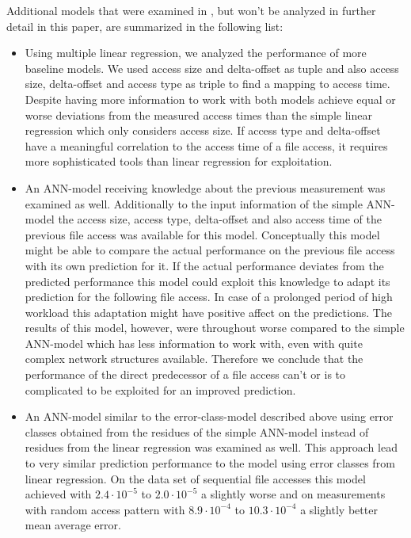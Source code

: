 \documentclass{superfri}
\begin{document}
	Additional models that were examined in \cite{VVEIHUDVVN15}, but won't be analyzed in further detail in this paper, are summarized in the following list:
	\begin{itemize}
		\item Using multiple linear regression, we analyzed the performance of more baseline models. We used access size and delta-offset as tuple and also access size, delta-offset and access type as triple to find a mapping to access time.
		Despite having more information to work with both models achieve equal or worse deviations from the measured access times than the simple linear regression which only considers access size.
		If access type and delta-offset have a meaningful correlation to the access time of a file access, it requires more sophisticated tools than linear regression for exploitation.
		\item An ANN-model receiving knowledge about the previous measurement was examined as well.
		Additionally to the input information of the simple ANN-model the access size, access type, delta-offset and also access time of the previous file access was available for this model.
		Conceptually this model might be able to compare the actual performance on the previous file access with its own prediction for it. If the actual performance deviates from the predicted performance this model could exploit this knowledge to adapt its prediction for the following file access. In case of a prolonged period of high workload this adaptation might have positive affect on the predictions.
		The results of this model, however, were throughout worse compared to the simple ANN-model which has less information to work with, even with quite complex network structures available. 
		Therefore we conclude that the performance of the direct predecessor of a file access can't or is to complicated to be exploited for an improved prediction.
		\item An ANN-model similar to the error-class-model described above using error classes obtained from the residues of the simple ANN-model instead of residues from the linear regression was examined as well. This approach lead to very similar prediction performance to the model using error classes from linear regression. On the data set of sequential file accesses this model achieved with $2.4\cdot10^{-5}$ to $2.0\cdot10^{-5}$ a slightly worse and on measurements with random access pattern with  $8.9\cdot10^{-4}$ to $10.3\cdot10^{-4}$ a slightly better mean average error.
	\end{itemize}
	
\end{document}
